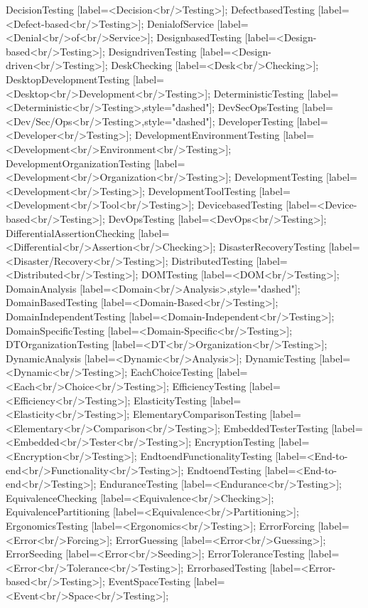 \documentclass{article}
\begin{document}
{DecisionTesting [label=<Decision<br/>Testing>];
DefectbasedTesting [label=<Defect-based<br/>Testing>];
DenialofService [label=<Denial<br/>of<br/>Service>];
DesignbasedTesting [label=<Design-based<br/>Testing>];
DesigndrivenTesting [label=<Design-driven<br/>Testing>];
DeskChecking [label=<Desk<br/>Checking>];
DesktopDevelopmentTesting [label=<Desktop<br/>Development<br/>Testing>];
DeterministicTesting [label=<Deterministic<br/>Testing>,style="dashed"];
DevSecOpsTesting [label=<Dev/Sec/Ops<br/>Testing>,style="dashed"];
DeveloperTesting [label=<Developer<br/>Testing>];
DevelopmentEnvironmentTesting [label=<Development<br/>Environment<br/>Testing>];
DevelopmentOrganizationTesting [label=<Development<br/>Organization<br/>Testing>];
DevelopmentTesting [label=<Development<br/>Testing>];
DevelopmentToolTesting [label=<Development<br/>Tool<br/>Testing>];
DevicebasedTesting [label=<Device-based<br/>Testing>];
DevOpsTesting [label=<DevOps<br/>Testing>];
DifferentialAssertionChecking [label=<Differential<br/>Assertion<br/>Checking>];
DisasterRecoveryTesting [label=<Disaster/Recovery<br/>Testing>];
DistributedTesting [label=<Distributed<br/>Testing>];
DOMTesting [label=<DOM<br/>Testing>];
DomainAnalysis [label=<Domain<br/>Analysis>,style="dashed"];
DomainBasedTesting [label=<Domain-Based<br/>Testing>];
DomainIndependentTesting [label=<Domain-Independent<br/>Testing>];
DomainSpecificTesting [label=<Domain-Specific<br/>Testing>];
DTOrganizationTesting [label=<DT<br/>Organization<br/>Testing>];
DynamicAnalysis [label=<Dynamic<br/>Analysis>];
DynamicTesting [label=<Dynamic<br/>Testing>];
EachChoiceTesting [label=<Each<br/>Choice<br/>Testing>];
EfficiencyTesting [label=<Efficiency<br/>Testing>];
ElasticityTesting [label=<Elasticity<br/>Testing>];
ElementaryComparisonTesting [label=<Elementary<br/>Comparison<br/>Testing>];
EmbeddedTesterTesting [label=<Embedded<br/>Tester<br/>Testing>];
EncryptionTesting [label=<Encryption<br/>Testing>];
EndtoendFunctionalityTesting [label=<End-to-end<br/>Functionality<br/>Testing>];
EndtoendTesting [label=<End-to-end<br/>Testing>];
EnduranceTesting [label=<Endurance<br/>Testing>];
EquivalenceChecking [label=<Equivalence<br/>Checking>];
EquivalencePartitioning [label=<Equivalence<br/>Partitioning>];
ErgonomicsTesting [label=<Ergonomics<br/>Testing>];
ErrorForcing [label=<Error<br/>Forcing>];
ErrorGuessing [label=<Error<br/>Guessing>];
ErrorSeeding [label=<Error<br/>Seeding>];
ErrorToleranceTesting [label=<Error<br/>Tolerance<br/>Testing>];
ErrorbasedTesting [label=<Error-based<br/>Testing>];
EventSpaceTesting [label=<Event<br/>Space<br/>Testing>];
}
\end{document}
